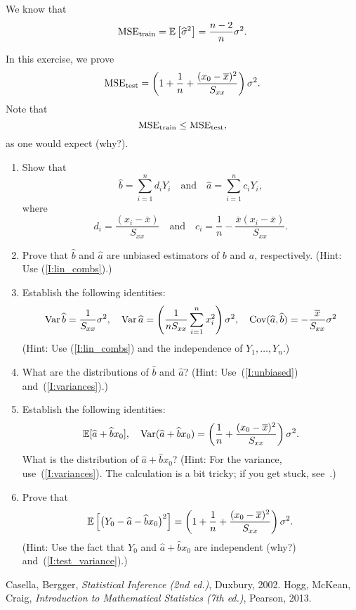 \documentclass[12pt]{amsart}
\begin{document}
\begin{enumerate}
    We know that
    \[
        \operatorname{MSE}_{\text{train}} = \operatorname{\mathbb{E}}\left[\widehat{\sigma}^2\right] = \frac{n-2}n\sigma^2.
    \]
    
    In this exercise, we prove
    \[
        \operatorname{MSE}_{\text{test}} = \left(1 + \frac1n + \frac{(x_0-\overline x)^2}{S_{xx}} \right)\sigma^2.
    \]
    Note that
    \[
        \operatorname{MSE}_\text{train}\leq  \operatorname{MSE}_{\text{test}},
    \]
    as one would expect (why?).
    
    \begin{enumerate}
        \setlength\itemsep{0.5em}
        \item\label{I:lin_combs} Show that
        \[
            \hat b = \sum_{i=1}^n d_i Y_i\quad\text{and}\quad
            \hat a = \sum_{i=1}^n c_i Y_i,
        \]
        where
        \[
            d_i=\frac{(x_i-\bar x)}{S_{xx}}\quad\text{and}\quad
            c_i = \frac1n - \frac{\bar x(x_i - \bar x)}{S_{xx}}.
        \]

        \item\label{I:unbiased} Prove that $\hat b$ and $\hat a$ are unbiased estimators of $b$ and $a$, respectively. (Hint: Use (\ref{I:lin_combs}).)
        
        \item\label{I:variances} Establish the following identities:
        \[
            \operatorname{Var}\widehat b = \frac1{S_{xx}}\sigma^2,\quad
            \operatorname{Var}\widehat a = \left(\frac1{nS_{xx}}\sum_{i=1}^n x_i^2\right)\sigma^2,\quad
            \operatorname{Cov}(\widehat a, \widehat b) = -\frac{\overline x}{S_{xx}}\sigma^2
        \]
        (Hint: Use (\ref{I:lin_combs}) and the independence of $Y_1,\ldots,Y_n$.)
        
        \item What are the distributions of $\hat b$ and $\hat a$? (Hint: Use~(\ref{I:unbiased}) and~(\ref{I:variances}).)
        
        \item Establish the following identities:
        \[
            \operatorname{\mathbb{E}}[\widehat a + \widehat b x_0],\quad \operatorname{Var}(\widehat a + \widehat b x_0) = \left(\frac1n + \frac{(x_0-\overline x)^2}{S_{xx}} \right)\sigma^2.
        \]
        What is the distribution of $\hat a + \hat b x_0$?
        (Hint: For the variance, use~(\ref{I:variances}). The calculation is a bit tricky; if you get stuck, see~\cite[\S11.3.5]{CB}.)
        
        \item\label{I:test_variance} Prove that
        \[
            \operatorname{\mathbb{E}}\left[\big(Y_0 - \widehat a - \widehat b x_0\big)^2\right] = \left(1 + \frac1n + \frac{(x_0-\overline x)^2}{S_{xx}} \right)\sigma^2.
        \]
        (Hint: Use the fact that $Y_0$ and $\hat a + \hat b x_0$ are independent (why?) and~(\ref{I:test_variance}).)
    \end{enumerate}


    \end{enumerate}


    


    \begin{thebibliography}{99}
        Casella, Bergger, \emph{Statistical Inference (2nd ed.)}, Duxbury, 2002.
        Hogg, McKean, Craig, \emph{Introduction to Mathematical Statistics (7th ed.)}, Pearson, 2013.
    \end{thebibliography}
\end{document}
